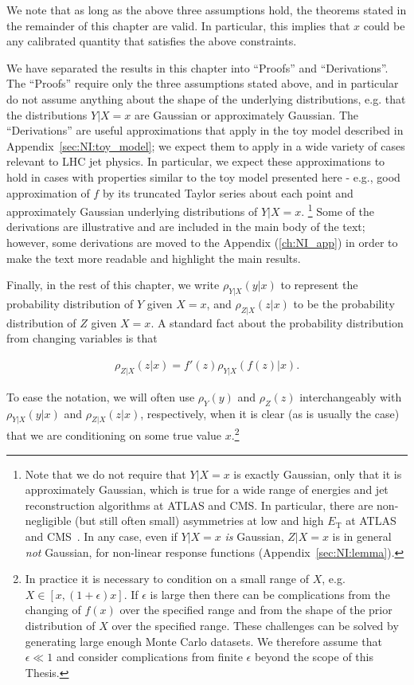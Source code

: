 We note that as long as the above three assumptions hold, the theorems stated in the remainder of this chapter are valid.
In particular, this implies that $x$ could be any calibrated quantity that satisfies the above constraints.

We have separated the results in this chapter into ``Proofs'' and ``Derivations''.
The ``Proofs'' require only the three assumptions stated above, and in particular do not assume anything about the shape of the underlying distributions, e.g. that the distributions $Y|X=x$ are Gaussian or approximately Gaussian.
The ``Derivations'' are useful approximations that apply in the toy model described in Appendix~\ref{sec:NI:toy_model}; we expect them to apply in a wide variety of cases relevant to LHC jet physics.
In particular, we expect these approximations to hold in cases with properties similar to the toy model presented here - e.g., good approximation of $f$ by its truncated Taylor series about each point and approximately Gaussian underlying distributions of $Y|X=x$.
\footnote{Note that we do not require that $Y|X=x$ is exactly Gaussian, only that it is approximately Gaussian, which is true for a wide range of energies and jet reconstruction algorithms at ATLAS and CMS. In particular, there are non-negligible (but still often small) asymmetries at low and high $E_\text{T}$ at ATLAS and CMS~\cite{Aad:2011he,Chatrchyan:2011ds,Khachatryan:2016kdb}. In any case, even if $Y|X=x$ {\it is} Gaussian, $Z|X=x$ is in general {\it not} Gaussian, for non-linear response functions (Appendix~\ref{sec:NI:lemma}).}
Some of the derivations are illustrative and are included in the main body of the text; however, some derivations are moved to the Appendix (\ref{ch:NI_app}) in order to make the text more readable and highlight the main results.

Finally, in the rest of this chapter, we write $\rho_{Y|X}(y|x)$ to represent the probability distribution of $Y$ given $X=x$, and $\rho_{Z|X}(z|x)$ to be the probability distribution of $Z$ given $X=x$. A standard fact about the probability distribution from changing variables is that

\begin{align}
\rho_{Z|X}(z|x) = f'(z)\rho_{Y|X}(f(z)|x).
\label{eqn:NI:newdist}
\end{align}

To ease the notation, we will often use $\rho_Y(y)$ and $\rho_Z(z)$ interchangeably with $\rho_{Y|X}(y|x)$ and $\rho_{Z|X}(z|x)$, respectively, when it is clear (as is usually the case) that we are conditioning on some true value $x$.\footnote{In practice it is necessary to condition on a small range of $X$, e.g. $X\in[x,(1+\epsilon)x]$. If $\epsilon$ is large then there can be complications from the changing of $f(x)$ over the specified range and from the shape of the prior distribution of $X$ over the specified range.  These challenges can be solved by generating large enough Monte Carlo datasets.  We therefore assume that $\epsilon \ll 1$ and consider complications from finite $\epsilon$ beyond the scope of this Thesis.}

